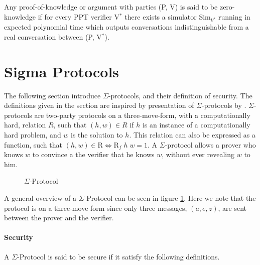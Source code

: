 \begin{definition}
  \label{def:zk}
  Any proof-of-knowledge or argument with parties (P, V) is said to be
  zero-knowledge if for every PPT verifier V$^{*}$ there exists a
  simulator $\text{Sim}_{V^{*}}$ running in expected polynomial time which outputs
  conversations indistinguishable from a real conversation between (P, V$^{*}$).
\end{definition}


\section{Sigma Protocols}
\label{sec:background:sigma_protocols}
The following section introduce $\Sigma$-protocols,
and their definition of security. The definitions given in the section are
inspired by presentation of $\Sigma$-protocols by \cite{on-sigma-protocols}.
$\Sigma$-protocols are two-party protocols on a three-move-form, with a
computationally hard, relation $R$, such that $(h, w) \in R$ if $h$ is an
instance of a computationally hard problem, and $w$ is the solution to $h$.
This relation can also be expressed as a function, such that
$(h,w) \in \text{R} \iff \text{R}_{f} \; h \; w = 1$.
A $\Sigma$-protocol allows a prover who knows $w$ to convince a
the verifier that he knows $w$, without ever revealing $w$ to him.


\begin{figure}[ht]
  \centering
  \caption{\label{fig:proto_sigma} $\Sigma$-Protocol}
\end{figure}

A general overview of a $\Sigma$-Protocol can be seen in figure
\ref{fig:proto_sigma}. Here we note that the protocol is on a three-move form
since only three messages, $(a,e,z)$, are sent between the prover and the verifier.

\paragraph{Security}
A $\Sigma$-Protocol is said to be secure if it satisfy the following definitions.

